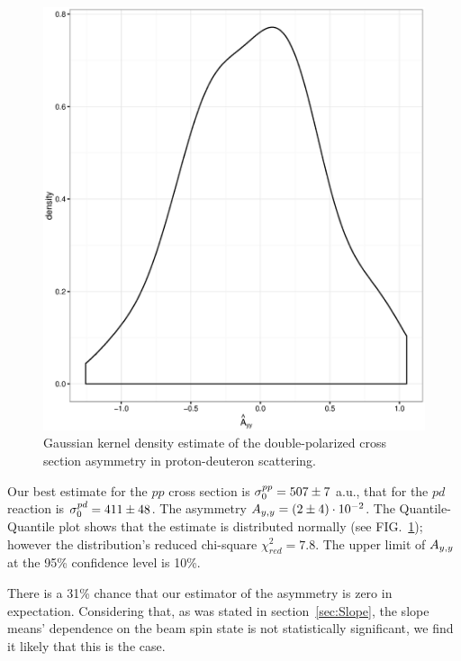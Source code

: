 \documentclass[reprint, superscriptaddress]{revtex4-1}
\newcommand{\vp}[2]{#1\cdot10^{#2}}
\begin{document}
\begin{figure}[h]
	\centering
	\includegraphics[scale=.35]{img/Ayy_dens.eps}
	\caption{Gaussian kernel density estimate of the double-polarized cross section asymmetry in proton-deuteron scattering.\label{fig:AyyDensity}}
\end{figure}

Our best estimate for the $pp$ cross section is $\CS[0]^{pp} = 507 \pm 7$ a.u., that for the $pd$ reaction is $\CS[0]^{pd} = 411 \pm 48$. The asymmetry $\Ayy = \vp{(2 \pm 4)}{-2}$. The Quantile-Quantile plot shows that the estimate is distributed normally (see FIG.~\ref{fig:AyyDensity}); however the distribution's reduced chi-square $\chi^2_{red} = 7.8$. The upper limit of $\Ayy$ at the 95\% confidence level is 10\%.

There is a 31\% chance that our estimator of the asymmetry is zero in expectation. Considering that, as was stated in section~\ref{sec:Slope}, the slope means' dependence on the beam spin state is not statistically significant, we find it likely that this is the case. 
\end{document}
